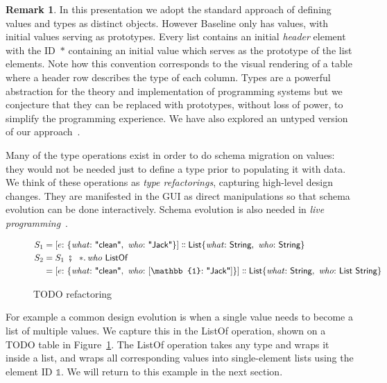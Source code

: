 \documentclass[english,submission]{programming}
\theoremstyle{definition}
\newtheorem*{remark}{Remark}
\newcommand{\mathbox}[1]{\colorbox{black!10}{$#1$}}
\DeclareMathOperator{\exec}{\ \fatsemi\ \ }
\newcommand{\is}{{:}\ }
\newcommand{\comma}{,\ }
\newcommand{\isa}{\dblcolon}
\newcommand{\quotedstring}[1]{\textsf{\textquotedbl{#1}\textquotedbl}}
\begin{document}
\begin{remark}
In this presentation we adopt the standard approach of defining values and types as distinct objects. However Baseline only has values, with initial values serving as prototypes. Every list contains an initial \textit{header} element with the ID~\mathbox{*} containing an initial value which serves as the prototype of the list elements. Note how this convention corresponds to the visual rendering of a table where a header row describes the type of each column. Types are a powerful abstraction for the theory and implementation of programming systems but we conjecture that they can be replaced with prototypes, without loss of power, to simplify the programming experience. We have also explored an untyped version of our approach~\cite{denicek}.
\end{remark}

Many of the type operations exist in order to do schema migration on values: they would not be needed just to define a type prior to populating it with data. We think of these operations as \textit{type refactorings}, capturing high-level design changes. They are manifested in the GUI as direct manipulations so that schema evolution can be done interactively. Schema evolution is also needed in \textit{live programming}~\cite{challenge-problems}.
\begin{figure}[h]
\begin{align*}
  S_1 &= [
    e \is \{ \mathit{what}\is \quotedstring{clean}\comma  \mathit{who}\is \quotedstring{Jack} \}
    ] \isa
    \textsf{List}\{ \mathit{what}\is \textsf{String}\comma \mathit{who}\is \textsf{String} \}\\
S_2 &= S_1 \exec *\ldotp \mathit{who} \textsf{ ListOf } \\
 &= [
    e \is \{ \mathit{what}\is \quotedstring{clean}\comma  \mathit{who}\is [\mathbb{1}\is \quotedstring{Jack}] \}
    ] \isa
    \textsf{List}\{ \mathit{what}\is \textsf{String}\comma  \mathit{who}\is \textsf{List String} \}\\
\end{align*}
\vspace{-40pt}
\caption{TODO refactoring}
\label{fig:TODO-refactor}
\end{figure}

For example a common design evolution is when a single value needs to become a list of multiple values. We capture this in the \textsf{ListOf} operation, shown on a TODO table in Figure~\ref{fig:TODO-refactor}.
The \textsf{ListOf} operation takes any type and wraps it inside a list, and wraps all corresponding values into single-element lists using the element ID $\mathbb{1}$. We will return to this example in the next section.
\end{document}
